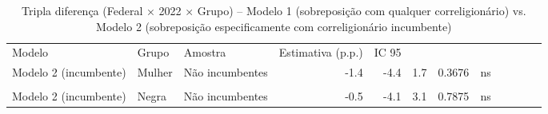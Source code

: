 \begin{table}[!h]
\centering
\caption{Tripla diferença (Federal × 2022 × Grupo) -- Modelo 1 (sobreposição com qualquer correligionário) vs. Modelo 2 (sobreposição especificamente com correligionário incumbente)}
\centering
\begin{tabular}[t]{lllrrrrl}
\toprule
Modelo & Grupo & Amostra & Estimativa (p.p.) & IC 95%
\midrule
{} &  &  &  &  &  &  & \\
Modelo 2 (incumbente) & Mulher & Não incumbentes & -1.4 & -4.4 & 1.7 & 0.3676 & ns\\
 &  &  &  &  &  &  & \\
Modelo 2 (incumbente) & Negra & Não incumbentes & -0.5 & -4.1 & 3.1 & 0.7875 & ns\\
\bottomrule
\end{tabular}
\end{table}

